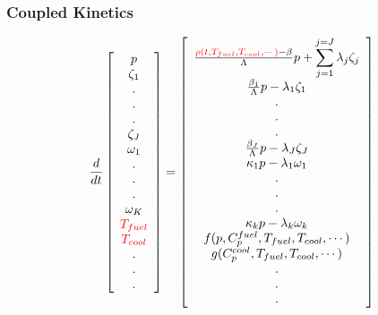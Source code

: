 \begin{frame}[fragile]
  \frametitle{Coupled Kinetics}
  \footnotesize{
\begin{equation} 
  \frac{d}{dt}\left[
    \begin{array}{c}
      p\\
      \zeta_1\\
      .\\
      .\\
      .\\
      \zeta_J\\
      \omega_1\\
      .\\
      .\\
      .\\
      \omega_K\\
      \textcolor{red}{T_{fuel}}\\
      \textcolor{red}{T_{cool}}\\
      .\\
      .\\
      .\\
    \end{array}
    \right]
    =
    \left[
      \begin{array}{ c }
        \frac{\textcolor{red}{\rho(t,T_{fuel},T_{cool},\cdots)}-\beta}{\Lambda}p + 
        \displaystyle\sum^{j=J}_{j=1}\lambda_j\zeta_j\\
        \frac{\beta_1}{\Lambda} p - \lambda_1\zeta_1\\
        .\\
        .\\
        .\\
        \frac{\beta_J}{\Lambda}p-\lambda_J\zeta_J\\
        \kappa_1p - \lambda_1\omega_1\\
        .\\
        .\\
        .\\
        \kappa_{k} p - \lambda_k\omega_{k}\\
        f(p, C_p^{fuel}, T_{fuel}, T_{cool},\cdots)\\
        g(C_p^{cool}, T_{fuel}, T_{cool},\cdots)\\
        .\\
        .\\
        .\\
      \end{array}
      \right]
      \label{eqn:note_rho_prke}
    \end{equation}
  
  }
\end{frame}



